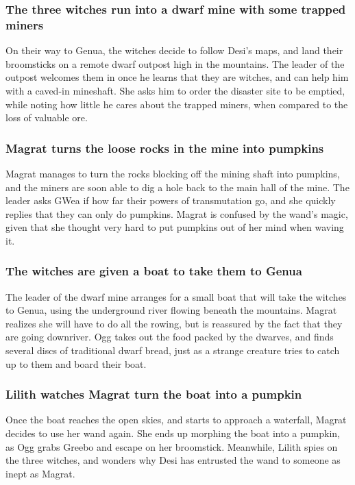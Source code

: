 \subsubsection{The three witches run into a dwarf mine with some trapped miners}
On their way to Genua, the witches decide to follow \Gls{Desi}'s maps, and land their broomsticks
on a remote dwarf outpost high in the mountains. The leader of the outpost welcomes them in once
he learns that they are witches, and can help him with a caved-in mineshaft. She asks him to order
the disaster site to be emptied, while noting how little he cares about the trapped miners, when
compared to the loss of valuable ore.

\subsubsection{\Gls{Magrat} turns the loose rocks in the mine into pumpkins}
\Gls{Magrat} manages to turn the rocks blocking off the mining shaft into pumpkins, and the miners
are soon able to dig a hole back to the main hall of the mine. The leader asks \Gls{GWea} if how
far their powers of transmutation go, and she quickly replies that they can only do pumpkins.
\Gls{Magrat} is confused by the wand's magic, given that she thought very hard to put pumpkins out
of her mind when waving it.

\subsubsection{The witches are given a boat to take them to Genua}
The leader of the dwarf mine arranges for a small boat that will take the witches to Genua, using
the underground river flowing beneath the mountains. \Gls{Magrat} realizes she will have to do all
the rowing, but is reassured by the fact that they are going downriver. \Gls{Ogg} takes out the food
packed by the dwarves, and finds several discs of traditional dwarf bread, just as a strange
creature tries to catch up to them and board their boat.

\subsubsection{\Gls{Lilith} watches \Gls{Magrat} turn the boat into a pumpkin}
Once the boat reaches the open skies, and starts to approach a waterfall, \Gls{Magrat} decides to
use her wand again. She ends up morphing the boat into a pumpkin, as \Gls{Ogg} grabs \Gls{Greebo}
and escape on her broomstick. Meanwhile, \Gls{Lilith} spies on the three witches, and wonders why
\Gls{Desi} has entrusted the wand to someone as inept as \Gls{Magrat}.

